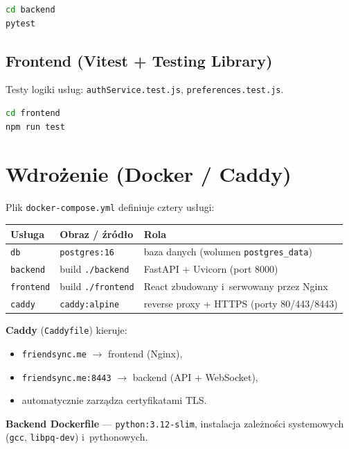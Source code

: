 \documentclass[11pt,a4paper]{article}
\begin{document}
\begin{lstlisting}[language=bash]
cd backend
pytest
\end{lstlisting}

\subsection{Frontend (Vitest + Testing Library)}
Testy logiki usług: \texttt{authService.test.js}, \texttt{preferences.test.js}.

\begin{lstlisting}[language=bash]
cd frontend
npm run test
\end{lstlisting}

\section{Wdrożenie (Docker / Caddy)}

Plik \texttt{docker-compose.yml} definiuje cztery usługi:

\begin{longtable}{L{2.2cm} L{4cm} L{6.5cm}}
\toprule
\textbf{Usługa} & \textbf{Obraz / źródło} & \textbf{Rola} \\
\midrule
\endhead
\texttt{db} & \texttt{postgres:16} & baza danych (wolumen \texttt{postgres\_data}) \\
\texttt{backend} & build \texttt{./backend} & FastAPI + Uvicorn (port 8000) \\
\texttt{frontend} & build \texttt{./frontend} & React zbudowany i~serwowany przez Nginx \\
\texttt{caddy} & \texttt{caddy:alpine} & reverse proxy + HTTPS (porty 80/443/8443) \\
\bottomrule
\end{longtable}

\textbf{Caddy} (\texttt{Caddyfile}) kieruje:
\begin{itemize}[noitemsep]
    \item \texttt{friendsync.me} $\rightarrow$ frontend (Nginx),
    \item \texttt{friendsync.me:8443} $\rightarrow$ backend (API + WebSocket),
    \item automatycznie zarządza certyfikatami TLS.
\end{itemize}

\textbf{Backend Dockerfile} --- \texttt{python:3.12-slim}, instalacja zależności systemowych
(\texttt{gcc}, \texttt{libpq-dev}) i~pythonowych.
\end{document}
